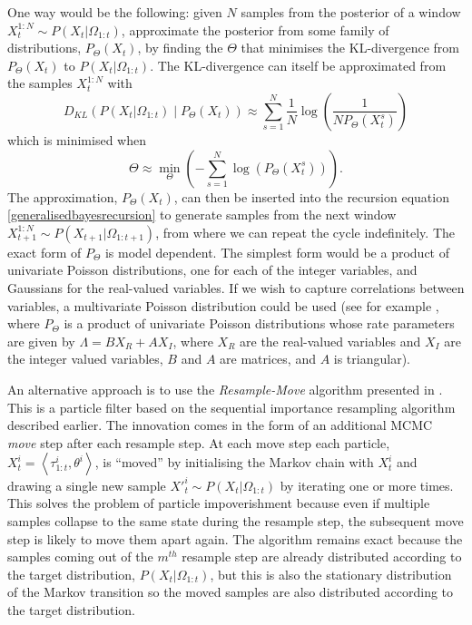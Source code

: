 \documentclass{article}
\begin{document}
One way would be the following: given $N$ samples from the posterior of a window $X^{1:N}_{t} \sim P(X_{t}|\Omega_{1:t})$, approximate the posterior from some family of distributions, $P_\Theta(X_t)$, by finding the $\Theta$ that minimises the KL-divergence from $P_\Theta(X_t)$ to $P(X_{t}|\Omega_{1:t})$. The KL-divergence can itself be approximated from the samples $X^{1:N}_t$ with
\[
D_{KL}\left(P(X_{t}|\Omega_{1:t}) \mid P_\Theta(X_t)  \right) \approx
\sum_{s=1}^N \frac{1}{N}\log\left(\frac{1}{N P_\Theta(X^s_t)}\right)
\]
which is minimised when
\[
\Theta \approx \min_\Theta \left(-\sum_{s=1}^N \log\left(P_\Theta\left(X^s_t\right)\right) \right).
\]
The approximation, $P_\Theta(X_t)$, can then be inserted into the recursion equation \eqref{generalisedbayesrecursion} to generate samples from the next window $X^{1:N}_{t+1} \sim P(X_{t+1}|\Omega_{1:t+1})$, from where we can repeat the cycle indefinitely. The exact form of $P_\Theta$ is model dependent. The simplest form would be a product of univariate Poisson distributions, one for each of the integer variables, and Gaussians for the real-valued variables. If we wish to capture correlations between variables, a multivariate Poisson distribution could be used (see for example \citet{munoz2021multivariate}, where $P_\Theta$ is a product of univariate Poisson distributions whose rate parameters are given by $\Lambda = B X_R + A X_I$, where $X_R$ are the real-valued variables and $X_I$ are the integer valued variables, $B$ and $A$ are matrices, and $A$ is triangular).

An alternative approach is to use the \textit{Resample-Move} algorithm presented in \citet{gilks2001following}. This is a particle filter based on the sequential importance resampling algorithm described earlier. The innovation comes in the form of an additional MCMC \textit{move} step after each resample step. At each move step each particle, $X^i_t = \left<\tau_{1:t}^i,\theta^i\right>$, is ``moved'' by initialising the Markov chain with $X^i_t$ and drawing a single new sample $X'^{i}_{t} \sim P(X_t|\Omega_{1:t})$ by iterating one or more times. This solves the problem of particle impoverishment because even if multiple samples collapse to the same state during the resample step, the subsequent move step is likely to move them apart again. The algorithm remains exact because the samples coming out of the $m^{th}$ resample step are already distributed according to the target distribution, $P(X_t|\Omega_{1:t})$, but this is also the stationary distribution of the Markov transition so the moved samples are also distributed according to the target distribution.
\end{document}
